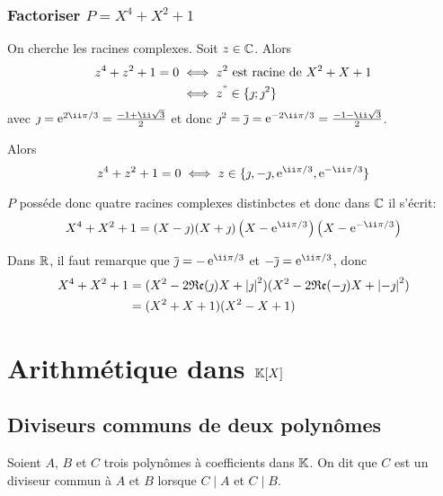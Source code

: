 \subsubsection{Factoriser $P=X^4+X^2+1$}

On cherche les racines complexes. Soit $z \in \mathbb{C}$. Alors
\begin{align}
  z^4+z^2+1=0 &\iff z^2 \text{~est racine de~} X^2+X+1 \\
  &\iff z^" \in \{\jmath ; \jmath^2\}
\end{align}
avec $\jmath=\e^{2\ii\pi/3} = \frac{-1+\ii\sqrt{3}}{2}$ et donc $\jmath^2=\bar{\jmath} = \e^{-2\ii\pi/3} = \frac{-1-\ii\sqrt{3}}{2}$. 

Alors
\begin{equation}
  z^4+z^2+1=0 \iff z \in \{\jmath, -\jmath, \e^{\ii\pi/3}, \e^{-\ii\pi/3}\}
\end{equation}

$P$ posséde donc quatre racines complexes distinbctes et donc dans $\mathbb{C}$ il s'écrit:
\begin{equation}
  X^4+X^2+1 = (X-\jmath)(X+\jmath)\left(X-\e^{\ii\pi/3}\right)\left(X-\e^{-\ii\pi/3}\right)
\end{equation}

Dans $\mathbb{R}$, il faut remarque que $\bar{\jmath}=-\e^{\ii\pi/3}$ et $-\bar{\jmath}=\e^{\ii\pi/3}$, donc
\begin{align}
  X^4+X^2+1 &= (X^2-2\mathfrak{Re}(\jmath)X+\left\lvert\jmath\right\rvert^2)(X^2-2\mathfrak{Re}(-\jmath)X+\left\lvert-\jmath\right\rvert^2)\\
  &=(X^2+X+1)(X^2-X+1)
\end{align}

\section{Arithmétique dans $\mathbb{K}[X]$}

\subsection{Diviseurs communs de deux polynômes}

\begin{defdef}
  Soient $A$, $B$ et $C$ trois polynômes à coefficients dans $\mathbb{K}$. On dit que $C$ est un diviseur commun à $A$ et $B$ lorsque $C\mid{}A$ et $C\mid{}B$.
\end{defdef}

